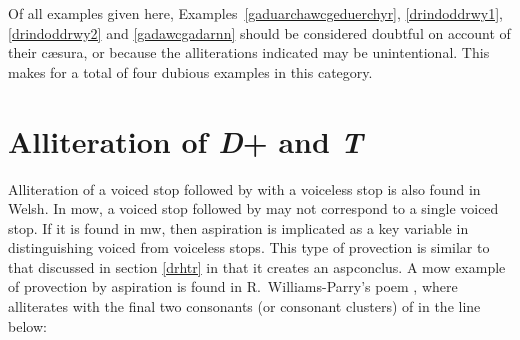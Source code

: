 \begin{mwl}
\end{mwl}
Of all examples given here, Examples~\ref{gaduarchawcgeduerchyr}, \ref{drindoddrwy1}, \ref{drindoddrwy2} and
\ref{gadawcgadarnn} should be considered doubtful on account of their c\ae sura, or because the alliterations indicated may be unintentional. This makes for a total of four dubious examples in this category.

\section{Alliteration of \textit{D}+ and \textit{T}}
\label{dht}
Alliteration of a voiced stop followed by  with a voiceless stop is also found in Welsh. In \gls{mow}, a voiced stop followed by  may not correspond to a single voiced stop. If it is found in \gls{mw}, then aspiration is implicated as a key variable in distinguishing voiced from voiceless stops. This type of provection is similar to that discussed in section \ref{drhtr} in that it creates an \gls{aspconclus}. A \gls{mow} example of provection by aspiration is found in R.\ Williams-Parry's poem , where  alliterates with the final two consonants (or consonant clusters) of  in the line below: 

